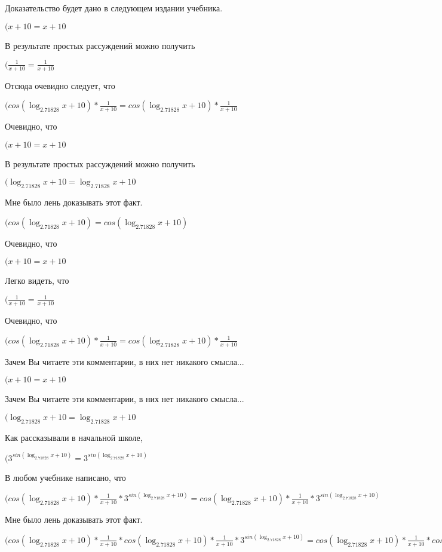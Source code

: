 \documentclass[12pt,a4paper,fleqn]{article}
\theoremstyle{definition}
\begin{document}
Доказательство будет дано в следующем издании учебника.

$( x  +  10  =  x  +  10 $

В результате простых рассуждений можно получить

$(\frac{ 1 }{ x  +  10 }
 = \frac{ 1 }{ x  +  10 }
$

Отсюда очевидно следует, что

$(cos(\log_{ 2.71828 }{ x  +  10 }) * \frac{ 1 }{ x  +  10 }
 = cos(\log_{ 2.71828 }{ x  +  10 }) * \frac{ 1 }{ x  +  10 }
$

Очевидно, что

$( x  +  10  =  x  +  10 $

В результате простых рассуждений можно получить

$(\log_{ 2.71828 }{ x  +  10 } = \log_{ 2.71828 }{ x  +  10 }$

Мне было лень доказывать этот факт.

$(cos(\log_{ 2.71828 }{ x  +  10 }) = cos(\log_{ 2.71828 }{ x  +  10 })$

Очевидно, что

$( x  +  10  =  x  +  10 $

Легко видеть, что

$(\frac{ 1 }{ x  +  10 }
 = \frac{ 1 }{ x  +  10 }
$

Очевидно, что

$(cos(\log_{ 2.71828 }{ x  +  10 }) * \frac{ 1 }{ x  +  10 }
 = cos(\log_{ 2.71828 }{ x  +  10 }) * \frac{ 1 }{ x  +  10 }
$

Зачем Вы читаете эти комментарии, в них нет никакого смысла...

$( x  +  10  =  x  +  10 $

Зачем Вы читаете эти комментарии, в них нет никакого смысла...

$(\log_{ 2.71828 }{ x  +  10 } = \log_{ 2.71828 }{ x  +  10 }$

Как рассказывали в начальной школе,

$({ 3 }^{sin(\log_{ 2.71828 }{ x  +  10 })} = { 3 }^{sin(\log_{ 2.71828 }{ x  +  10 })}$

В любом учебнике написано, что

$(cos(\log_{ 2.71828 }{ x  +  10 }) * \frac{ 1 }{ x  +  10 }
 * { 3 }^{sin(\log_{ 2.71828 }{ x  +  10 })} = cos(\log_{ 2.71828 }{ x  +  10 }) * \frac{ 1 }{ x  +  10 }
 * { 3 }^{sin(\log_{ 2.71828 }{ x  +  10 })}$

Мне было лень доказывать этот факт.

$(cos(\log_{ 2.71828 }{ x  +  10 }) * \frac{ 1 }{ x  +  10 }
 * cos(\log_{ 2.71828 }{ x  +  10 }) * \frac{ 1 }{ x  +  10 }
 * { 3 }^{sin(\log_{ 2.71828 }{ x  +  10 })} = cos(\log_{ 2.71828 }{ x  +  10 }) * \frac{ 1 }{ x  +  10 }
 * cos(\log_{ 2.71828 }{ x  +  10 }) * \frac{ 1 }{ x  +  10 }
 * { 3 }^{sin(\log_{ 2.71828 }{ x  +  10 })}$
\end{document}

